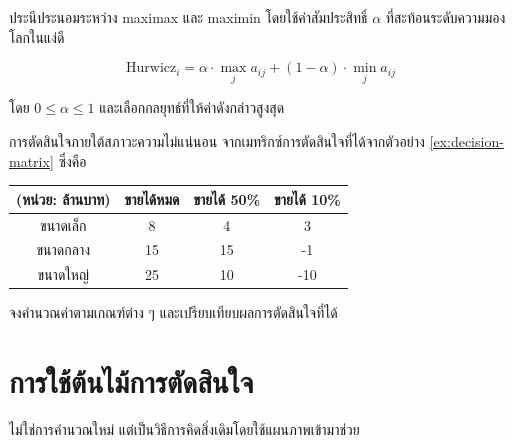 \begin{tcolorbox}[colback=white!100!white, colframe=black!80!white,
  title=Hurwicz criterion,
  fonttitle=\bfseries,
  sharp corners=southwest,
  boxrule=0.8pt,
  left=1mm, right=1mm, top=1mm, bottom=1mm,
]
ประนีประนอมระหว่าง maximax และ maximin โดยใช้ค่าสัมประสิทธิ์ $\alpha$ ที่สะท้อนระดับความมองโลกในแง่ดี

\[
\text{Hurwicz}_i = \alpha \cdot \max_j a_{ij} + (1 - \alpha) \cdot \min_j a_{ij}
\]

โดย $0 \leq \alpha \leq 1$ และเลือกกลยุทธ์ที่ให้ค่าดังกล่าวสูงสุด
\end{tcolorbox}

\begin{example}
    {การตัดสินใจภายใต้สภาวะความไม่แน่นอน}{}
    จากเมทริกซ์การตัดสินใจที่ได้จากตัวอย่าง \ref{ex:decision-matrix} ซึ่งคือ
    \begin{center}
        \begin{tabular}{|c|c|c|c|}
        \hline
            (หน่วย: ล้านบาท) & ขายได้หมด & ขายได้ 50\% & ขายได้ 10\% \\ \hline
            ขนาดเล็ก & 8 & 4 & 3 \\
            ขนาดกลาง & 15 & 15 & -1\\
            ขนาดใหญ่ & 25 & 10 & -10\\ \hline
        \end{tabular}
    \end{center}
    จงคำนวณค่าตามเกณฑ์ต่าง ๆ และเปรียบเทียบผลการตัดสินใจที่ได้ 
\end{example}
\newpage
\section{การใช้ต้นไม้การตัดสินใจ}
ไม่ใช่การคำนวณใหม่ แต่เป็นวิธีการคิดสิ่งเดิมโดยใช้แผนภาพเข้ามาช่วย
